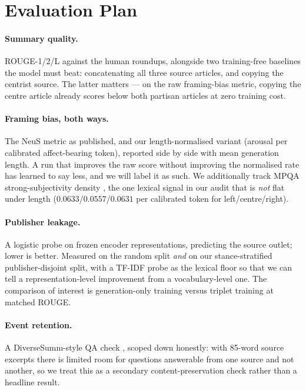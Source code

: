 \documentclass[10pt,twocolumn,a4paper]{article}
\begin{document}
\section{Evaluation Plan}

\paragraph{Summary quality.} ROUGE-1/2/L against the human roundups, alongside
two training-free baselines the model must beat: concatenating all three source
articles, and copying the centrist source. The latter matters --- on the raw
framing-bias metric, copying the centre article already scores below both
partisan articles at zero training cost.

\paragraph{Framing bias, both ways.} The NeuS metric as published, and our
length-normalised variant (arousal per calibrated affect-bearing token), reported
side by side with mean generation length. A run that improves the raw score
without improving the normalised rate has learned to say less, and we will label
it as such. We additionally track MPQA strong-subjectivity density
\cite{wilson2005mpqa}, the one lexical signal in our audit that is \emph{not}
flat under length ($0.0633$/$0.0557$/$0.0631$ per calibrated token for
left/centre/right).

\paragraph{Publisher leakage.} A logistic probe on frozen encoder
representations, predicting the source outlet; lower is better. Measured on the
random split \emph{and} on our stance-stratified publisher-disjoint split, with a
TF-IDF probe as the lexical floor so that we can tell a representation-level
improvement from a vocabulary-level one. The comparison of interest is
generation-only training versus triplet training at matched ROUGE.

\paragraph{Event retention.} A DiverseSumm-style QA check
\cite{huang2024diversesumm}, scoped down honestly: with 85-word source excerpts
there is limited room for questions answerable from one source and not another,
so we treat this as a secondary content-preservation check rather than a headline
result.
\end{document}
